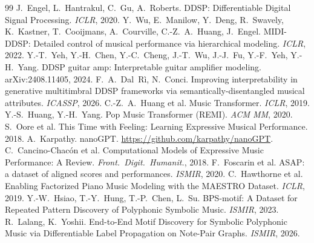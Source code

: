 \begin{thebibliography}{99}
 J.~Engel, L.~Hantrakul, C.~Gu, A.~Roberts.
  DDSP: Differentiable Digital Signal Processing. \emph{ICLR}, 2020.
 Y.~Wu, E.~Manilow, Y.~Deng, R.~Swavely, K.~Kastner,
  T.~Cooijmans, A.~Courville, C.-Z.~A.~Huang, J.~Engel.
  MIDI-DDSP: Detailed control of musical performance via hierarchical
  modeling. \emph{ICLR}, 2022.
 Y.-T.~Yeh, Y.-H.~Chen, Y.-C.~Cheng, J.-T.~Wu,
  J.-J.~Fu, Y.-F.~Yeh, Y.-H.~Yang.
  DDSP guitar amp: Interpretable guitar amplifier modeling.
  arXiv:2408.11405, 2024.
 F.~A.~Dal~R\`i, N.~Conci.
  Improving interpretability in generative multitimbral DDSP frameworks
  via semantically-disentangled musical attributes. \emph{ICASSP}, 2026.
 C.-Z.~A.~Huang et al.
  Music Transformer. \emph{ICLR}, 2019.
 Y.-S.~Huang, Y.-H.~Yang.
  Pop Music Transformer (REMI). \emph{ACM MM}, 2020.
 S.~Oore et al.
  This Time with Feeling: Learning Expressive Musical Performance. 2018.
 A.~Karpathy. nanoGPT. \url{https://github.com/karpathy/nanoGPT}.
 C.~Cancino-Chac\'on et al.
  Computational Models of Expressive Music Performance: A Review.
  \emph{Front.\ Digit.\ Humanit.}, 2018.
 F.~Foscarin et al.
  ASAP: a dataset of aligned scores and performances. \emph{ISMIR}, 2020.
 C.~Hawthorne et al.
  Enabling Factorized Piano Music Modeling with the MAESTRO Dataset.
  \emph{ICLR}, 2019.
 Y.-W.~Hsiao, T.-Y.~Hung, T.-P.~Chen, L.~Su.
  BPS-motif: A Dataset for Repeated Pattern Discovery of Polyphonic Symbolic
  Music. \emph{ISMIR}, 2023.
 R.~Lalang, K.~Yoshii. End-to-End Motif Discovery
  for Symbolic Polyphonic Music via Differentiable Label Propagation on
  Note-Pair Graphs. \emph{ISMIR}, 2026.
\end{thebibliography}
